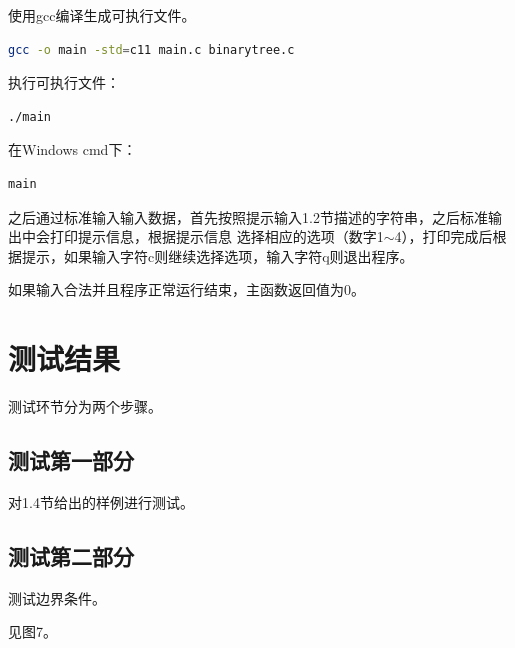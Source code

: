 \documentclass{article}
\begin{document}
使用gcc编译生成可执行文件。

\begin{lstlisting}[language={bash},
    basicstyle=\small\consolas]
gcc -o main -std=c11 main.c binarytree.c
\end{lstlisting}

执行可执行文件：

\begin{lstlisting}[language={bash},
    basicstyle=\small\consolas]
./main
\end{lstlisting}

在Windows cmd下：

\begin{lstlisting}[language={bash},
    basicstyle=\small\consolas]
main
\end{lstlisting}

之后通过标准输入输入数据，首先按照提示输入1.2节描述的字符串，之后标准输出中会打印提示信息，根据提示信息
选择相应的选项（数字1$\sim$4），打印完成后根据提示，如果输入字符c则继续选择选项，输入字符q则退出程序。

如果输入合法并且程序正常运行结束，主函数返回值为0。

\section{测试结果}

测试环节分为两个步骤。

\subsection{测试第一部分}

对1.4节给出的样例进行测试。

\subsection{测试第二部分}

测试边界条件。

见图7。
\end{document}
